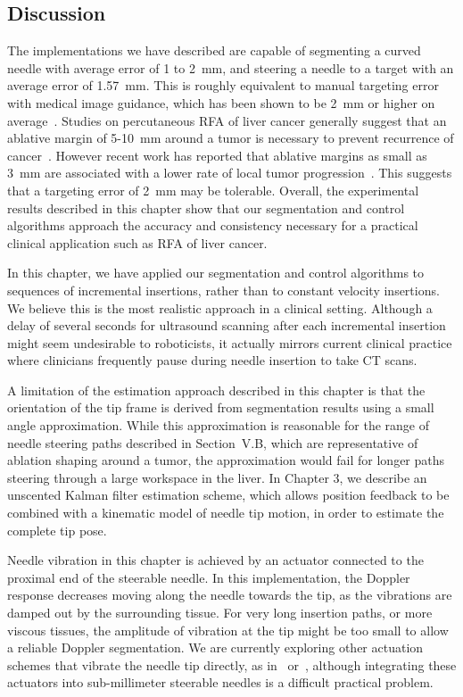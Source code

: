 \subsection{Discussion}
The implementations we have described are capable of segmenting a curved needle with average error of 1 to 2~mm, and steering a needle to a target with an average error of 1.57~mm. This is roughly equivalent to manual targeting error with medical image guidance, which has been shown to be 2~mm or higher on average~\cite{Crocetti2008,MaierHein2008,Schubert2013}. Studies on percutaneous RFA of liver cancer generally suggest that an ablative margin of 5-10~mm around a tumor is necessary to prevent recurrence of cancer~\cite{Dodd2001,Kim2006,Gervais2009}. However recent work has reported that ablative margins as small as 3~mm are associated with a lower rate of local tumor progression~\cite{Kim2010}. This suggests that a targeting error of 2~mm may be tolerable. Overall, the experimental results described in this chapter show that our segmentation and control algorithms approach the accuracy and consistency necessary for a practical clinical application such as RFA of liver cancer. 

In this chapter, we have applied our segmentation and control algorithms to sequences of incremental insertions, rather than to constant velocity insertions. We believe this is the most realistic approach in a clinical setting. Although a delay of several seconds for ultrasound scanning after each incremental insertion might seem undesirable to roboticists, it actually mirrors current clinical practice where clinicians frequently pause during needle insertion to take CT scans. 

A limitation of the estimation approach described in this chapter is that the orientation of the tip frame is derived from segmentation results using a small angle approximation. While this approximation is reasonable for the range of needle steering paths described in Section~V.B, which are representative of ablation shaping around a tumor, the approximation would fail for longer paths steering through a large workspace in the liver. In Chapter 3, we describe an unscented Kalman filter estimation scheme, which allows position feedback to be combined with a kinematic model of needle tip motion, in order to estimate the complete tip pose.

Needle vibration in this chapter is achieved by an actuator connected to the proximal end of the steerable needle. In this implementation, the Doppler response decreases moving along the needle towards the tip, as the vibrations are damped out by the surrounding tissue. For very long insertion paths, or more viscous tissues, the amplitude of vibration at the tip might be too small to allow a reliable Doppler segmentation. We are currently exploring other actuation schemes that vibrate the needle tip directly, as in~\cite{Harmat2006} or~\cite{McAleavey2003}, although integrating these actuators into sub-millimeter steerable needles is a difficult practical problem.

